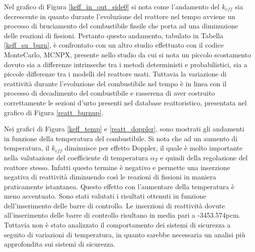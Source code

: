 Nel grafico di Figura \ref{keff_in_out_side0} si nota come l'andamento del 
$k_{eff}$ sia decrescente in quanto durante l'evoluzione del reattore nel tempo 
avviene un processo di bruciamento del combustibile fissile che porta ad una 
diminuzione delle reazioni di fissioni.
Pertanto questo andamento, tabulato in Tabella \ref{keff_su_burn}, è 
confrontato 
con un altro studio effettuato con il codice MonteCarlo, MCNPX, presente nello 
studio \cite{rocchi2013d07} da cui si nota un piccolo scostamento dovuto sia a 
differenze intrinseche tra i metodi deterministi e probabilistici, sia a 
piccole 
differenze tra i modelli del reattore usati.
Tuttavia la variazione di reattività durante l'evoluzione del combustibile nel 
tempo è in linea con il processo di decadimento del combustibile e rasserena di 
aver costruito correttamente le sezioni d'urto presenti nel database 
reattoristico, presentata nel grafico di Figura \ref{reatt_burnup}.

Nei grafici di Figura \ref{keff_temp} e \ref{reatt_doppler}, sono mostrati gli 
andamenti in funzione della temperatura del combustibile. Si nota che ad un 
aumento di temperatura, il $k_{eff}$ diminuisce per effetto Doppler, il quale è 
molto importante nella valutazione del coefficiente di temperatura $\alpha_T$ e 
quindi della regolazione del reattore stesso.
Infatti questo termine è negativo e permette una inserzione negativa di 
reattività diminuendo così le reazioni di fissioni in maniera praticamente 
istantanea. Questo effetto con l'aumentare della temperatura è meno accentuato.
Sono stati valutati i risultati ottenuti in funzione dell'inserimento delle barre 
di controllo. 
Le inserzioni di reattività dovute all'inserimento delle barre di controllo 
risultano in media pari a -3453.574pcm. Tuttavia non è stato analizzato il 
comportamento dei sistemi di sicurezza a seguito di variazioni di temperatura, 
in quanto sarebbe necessaria un analisi più approfondita sui sistemi di 
sicurezza.

